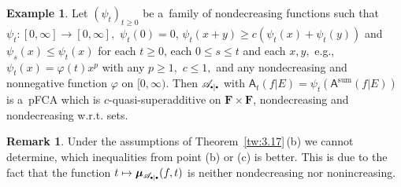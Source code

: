 \documentclass[preprint,11pt]{elsarticle}
\theoremstyle{definition}
\newtheorem{example}[tw]{Example}
\newtheorem{remark}[tw]{Remark}
\newcommand\bF{\mathbf{F}} %
\newcommand\bFs{\bF_0^2} %
\newcommand\sA{\mathsf{A}}
\newcommand\aAi[3][E]{\sA^{#3}(#2|#1)}%
\newcommand\sbullet[1][.5]{\mathbin{\vcenter{\hbox{\scalebox{#1}{$\bullet$}}}}}
\newcommand\bpeA{\mathscr {A}_{\sbullet|\sbullet}}%
\newcommand\bE{{\mathscr {E}}}
\newcommand{\bmu}{\boldsymbol{\mu}}
\newcommand\bmub[1][\bpeA]{\bmu_{#1}}
\renewcommand\ge{\geqslant}
\renewcommand\le{\leqslant}
\newcommand{\oh}{\color{brown}{}}
\newcommand{\mb}{\color{blue}{}}
\newcommand{\mk}{\color{red}{}}
\newcommand{\mi}{\color{darkgreen}{}}
\begin{document}




\begin{example}
Let $(\psi_t)_{t\ge 0}$ be a~family of nondecreasing functions such that $\psi_t\colon [0,\infty]\to[0,\infty],$ $\psi_t(0)=0$,  $\psi_t(x+y)\ge c(\psi_t(x)+\psi_t(y))$   and  $\psi_s(x)\le \psi_t(x)$ for each $t\ge 0$, each $0\le s\le t$ and each $x,y,$ e.g., $\psi _t(x)=\varphi(t)x^p$ with any $p\ge 1,$ $c\le 1,$ and any nondecreasing and nonnegative function $\varphi$ on $[0,\infty)$.
Then $\bpeA$ with $\sA_t(f|E)=\psi_t(\aAi{f}{\textrm{sum}})$ is a~pFCA which is $c$-quasi-superadditive on $\bF\times \bF$, nondecreasing and nondecreasing w.r.t. sets.
\end{example}

\begin{remark}
Under the assumptions of Theorem~\ref{tw:3.17}\,(b) we cannot determine, which in\-equa\-li\-ties from point (b) or (c) is better. This is due to the fact that the function $t\mapsto \bmub(f,t)$ is neither nondecreasing nor nonincreasing.
\end{remark}
\end{document}
